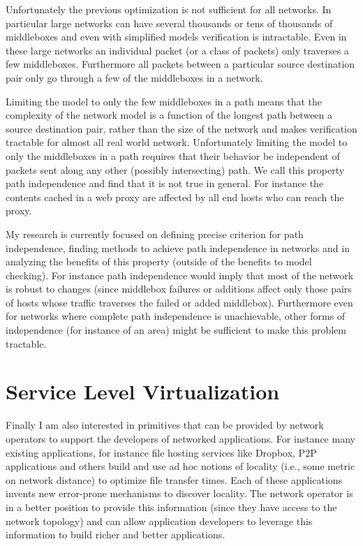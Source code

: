 \documentclass[letterpaper]{article}
\begin{document}
Unfortunately the previous optimization is not sufficient for all networks. In particular large networks can have
several thousands or tens of thousands of middleboxes and even with simplified models verification is intractable. Even
in these large networks an individual packet (or a class of packets) only traverses a few middleboxes. Furthermore all
packets between a particular source destination pair only go through a few of the middleboxes in a network. 

Limiting the model to only the few middleboxes in a path means that the complexity of the network model is a function of
the longest path between a source destination pair, rather than the size of the network and makes verification tractable
for almost all real world network. Unfortunately limiting the model to only the middleboxes in a path requires that
their behavior be independent of packets sent along any other (possibly intersecting) path. We call this property path
independence and find that it is not true in general. For instance the contents cached in a web proxy are affected by
all end hosts who can reach the proxy. 

My research is currently focused on defining precise criterion for path independence, finding  methods to achieve path
independence in networks and in analyzing the benefits of this property (outside of the benefits to model checking). For
instance path independence would imply that most of the network is robust to changes (since middlebox failures or
additions affect only those pairs of hosts whose traffic traverses the failed or added middlebox). 
Furthermore even for networks where complete path independence is unachievable, other forms of independence (for
instance of an area) might be sufficient to make this problem tractable.

\section*{Service Level Virtualization}
Finally I am also interested in primitives that can be provided by network operators to support the developers of
networked applications. For instance many existing applications, for instance file hosting services like Dropbox, P2P
applications and others build and use ad hoc notions of locality (i.e., some metric on network distance) to optimize
file transfer times. Each of these applications invents new error-prone mechanisms to discover locality. The network
operator is in a better position to provide this information (since they have access to the network topology) and can
allow application developers to leverage this information to build richer and better applications.
\end{document}
